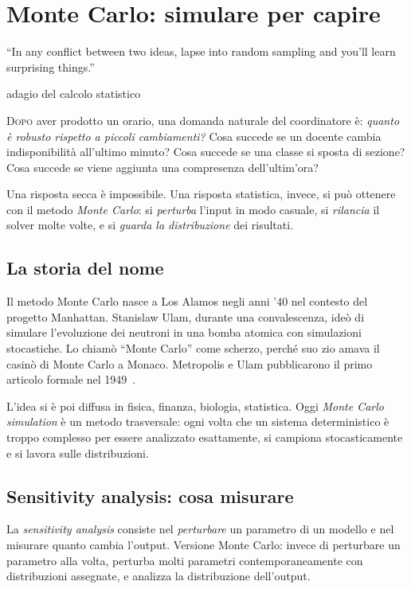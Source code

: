 \chapter{Monte Carlo: simulare per capire}
\label{ch:metodo_montecarlo}

\epigraph{``In any conflict between two ideas, lapse into
random sampling and you'll learn surprising things.''}{adagio
del calcolo statistico}

\lettrine[lines=3]{D}{opo} aver prodotto un orario, una
domanda naturale del coordinatore \`e: \emph{quanto \`e
robusto rispetto a piccoli cambiamenti?} Cosa succede se un
docente cambia indisponibilit\`a all'ultimo minuto? Cosa
succede se una classe si sposta di sezione? Cosa succede se
viene aggiunta una compresenza dell'ultim'ora?

Una risposta secca \`e impossibile. Una risposta statistica,
invece, si pu\`o ottenere con il metodo \emph{Monte
Carlo}: si \emph{perturba} l'input in
modo casuale, si \emph{rilancia} il solver molte volte, e
si \emph{guarda la distribuzione} dei risultati.

\section{La storia del nome}

\begin{storiabox}
Il metodo Monte Carlo nasce a Los Alamos negli anni '40
nel contesto del progetto Manhattan. Stanislaw Ulam, durante
una convalescenza, ide\`o di simulare l'evoluzione dei
neutroni in una bomba atomica con simulazioni stocastiche.
Lo chiam\`o ``Monte Carlo'' come scherzo, perch\'e suo zio
amava il casin\`o di Monte Carlo a Monaco. Metropolis e
Ulam pubblicarono il primo articolo formale nel
1949~\parencite{metropolis1949}.

L'idea si \`e poi diffusa in fisica, finanza, biologia,
statistica. Oggi \emph{Monte Carlo simulation} \`e un
metodo trasversale: ogni volta che un sistema deterministico
\`e troppo complesso per essere analizzato esattamente, si
campiona stocasticamente e si lavora sulle distribuzioni.
\end{storiabox}

\section{Sensitivity analysis: cosa misurare}

\begin{defbox}
La \emph{sensitivity
analysis} consiste nel
\emph{perturbare} un parametro di un modello e nel misurare
quanto cambia l'output. Versione Monte Carlo: invece di
perturbare un parametro alla volta, perturba molti parametri
contemporaneamente con distribuzioni assegnate, e analizza
la distribuzione dell'output.
\end{defbox}

